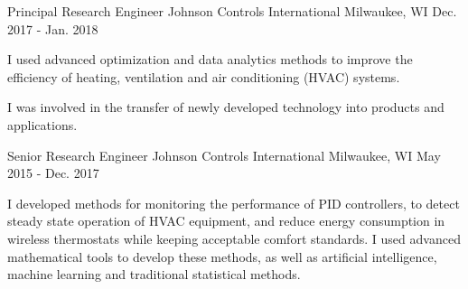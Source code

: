 

\begin{cventries}




  \cventry
    {Principal Research Engineer} %
    {Johnson Controls International} %
    {Milwaukee, WI} %
    {Dec. 2017 - Jan. 2018} %
    {
      \begin{cvitems} %
        \item {I used advanced optimization and data analytics methods to improve the efficiency of heating, ventilation and air conditioning (HVAC) systems.}
        \item {I was involved in the transfer of newly developed technology into products and applications.}
      \end{cvitems}
    }

  \cventry
    {Senior Research Engineer} %
    {Johnson Controls International} %
    {Milwaukee, WI} %
    {May 2015 - Dec. 2017} %
       {
      \begin{cvitems} %
        \item {I developed methods for monitoring the performance of PID controllers, to detect steady state operation of HVAC equipment, and reduce energy consumption in wireless thermostats while keeping acceptable comfort standards. I used advanced mathematical tools to develop these methods, as well as artificial intelligence, machine learning and traditional statistical methods.}
      \end{cvitems}
    }


\end{cventries}
